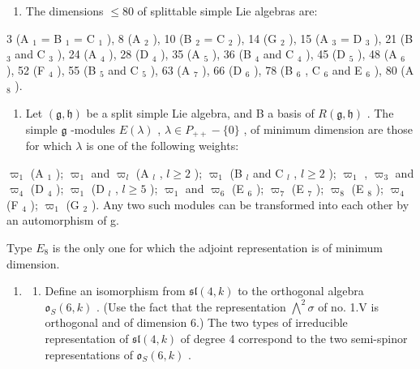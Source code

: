 
\begin{enumerate}
\def\labelenumi{\arabic{enumi})}
\tightlist
\item
  The dimensions \(\leq 80\) of splittable simple Lie algebras are:
\end{enumerate}

3 (A \(_{1}\) = B \(_{1}\) = C \(_{1}\) ), 8 (A \(_{2}\) ), 10 (B \(_{2}\) = C \(_{2}\) ), 14 (G \(_{2}\) ), 15 (A \(_{3}\) = D \(_{3}\) ), 21 (B \(_{3}\) and C \(_{3}\) ), 24 (A \(_{4}\) ), 28 (D \(_{4}\) ), 35 (A \(_{5}\) ), 36 (B \(_{4}\) and C \(_{4}\) ), 45 (D \(_{5}\) ), 48 (A \(_{6}\) ), 52 (F \(_{4}\) ), 55 (B \(_{5}\) and C \(_{5}\) ), 63 (A \(_{7}\) ), 66 (D \(_{6}\) ), 78 (B \(_{6}\) , C \(_{6}\) and E \(_{6}\) ), 80 (A \(_{8}\) ).

\begin{enumerate}
\def\labelenumi{\arabic{enumi})}
\setcounter{enumi}{1}
\tightlist
\item
  Let \((\mathfrak{g},\mathfrak{h})\) be a split simple Lie algebra, and B a basis of \(R(\mathfrak{g},\mathfrak{h})\) . The simple \(\mathfrak{g}\) -modules \(E(\lambda)\) , \(\lambda \in P_{++} - \{0\}\) , of minimum dimension are those for which \(\lambda\) is one of the following weights:
\end{enumerate}

\(\varpi_{1}\) (A \(_{1}\) ); \(\varpi_{1}\) and \(\varpi_{l}\) (A \(_{l}\) , \(l \geq 2\) ); \(\varpi_{1}\) (B \(_{l}\) and C \(_{l}\) , \(l \geq 2\) ); \(\varpi_{1}\) , \(\varpi_{3}\) and \(\varpi_{4}\) (D \(_{4}\) ); \(\varpi_{1}\) (D \(_{l}\) , \(l \geq 5\) ); \(\varpi_{1}\) and \(\varpi_{6}\) (E \(_{6}\) ); \(\varpi_{7}\) (E \(_{7}\) ); \(\varpi_{8}\) (E \(_{8}\) ); \(\varpi_{4}\) (F \(_{4}\) ); \(\varpi_{1}\) (G \(_{2}\) ). Any two such modules can be transformed into each other by an automorphism of g.

Type \(E_{8}\) is the only one for which the adjoint representation is of minimum dimension.

\begin{enumerate}
\def\labelenumi{\arabic{enumi})}
\setcounter{enumi}{2}
\tightlist
\item
  \begin{enumerate}
  \def\labelenumii{\alph{enumii})}
  \tightlist
  \item
    Define an isomorphism from \(\mathfrak{sl}(4,k)\) to the orthogonal algebra \(\mathfrak{o}_S(6,k)\) . (Use the fact that the representation \(\bigwedge^2\sigma\) of no. 1.V is orthogonal and of dimension 6.) The two types of irreducible representation of \(\mathfrak{sl}(4,k)\) of degree 4 correspond to the two semi-spinor representations of \(\mathfrak{o}_S(6,k)\) .
  \end{enumerate}
\end{enumerate}

